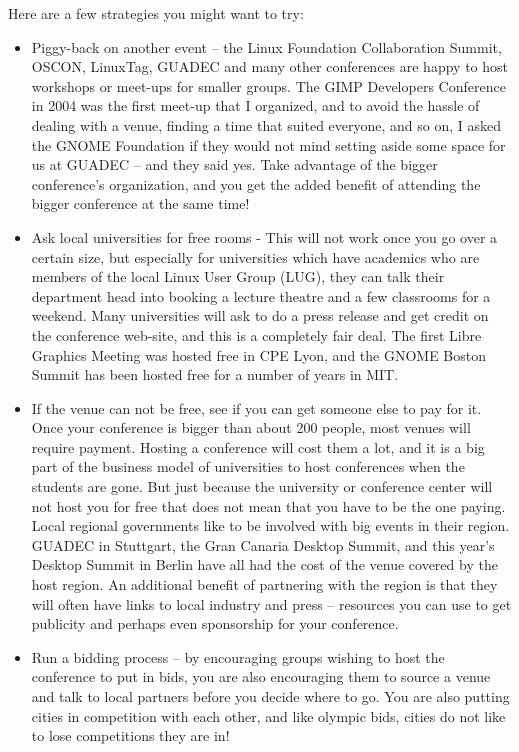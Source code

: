 Here are a few strategies you might want to try:
\begin{itemize}
 \item Piggy-back on another event -- the Linux Foundation Collaboration
Summit, OSCON, LinuxTag, GUADEC and many other conferences are happy to
host workshops or meet-ups for smaller groups. The GIMP Developers
Conference in 2004 was the first meet-up that I organized, and to avoid
the hassle of dealing with a venue, finding a time that suited everyone,
and so on, I asked the GNOME Foundation if they would not mind setting
aside some space for us at GUADEC -- and they said yes.
Take advantage of the bigger conference's organization, and you get the
added benefit of attending the bigger conference at the same time!
 \item Ask local universities for free rooms - This will not work once you go
over a certain size, but especially for universities which have
academics who are members of the local Linux User Group (LUG), they can talk
their
department head into booking a lecture theatre and a few classrooms for a
weekend. Many universities will ask to do a press release and get credit
on the conference web-site, and this is a completely fair deal.
The first Libre Graphics Meeting was hosted free in CPE Lyon, and the
GNOME Boston Summit has been hosted free for a number of years in MIT.
 \item If the venue can not be free, see if you can get someone else to pay
for it. Once your conference is bigger than about 200 people, most
venues will require payment. Hosting a conference will cost them a lot,
and it is a big part of the business model of universities to host
conferences when the students are gone. But just because the university
or conference center will not host you for free that does not mean that you have
to be the one paying. Local regional governments like to be involved with big
events in their
region. GUADEC in Stuttgart, the Gran Canaria Desktop Summit, and this
year's Desktop Summit in Berlin have all had the cost of the venue
covered by the host region. An additional benefit of partnering with the
region is that they will often have links to local industry and press --
resources you can use to get publicity and perhaps even sponsorship for
your conference.
 \item Run a bidding process -- by encouraging groups wishing to host the
conference to put in bids, you are also encouraging them to source a
venue and talk to local partners before you decide where to go. You are
also putting cities in competition with each other, and like olympic
bids, cities do not like to lose competitions they are in!
\end{itemize}

